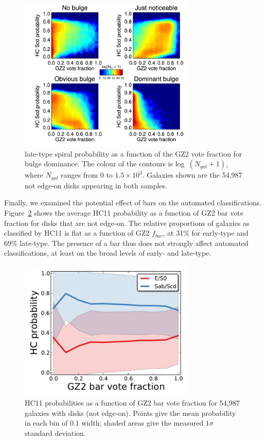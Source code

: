 \documentclass[useAMS,usenatbib]{mn2e}
\begin{document}
\begin{figure}
\includegraphics[angle=0,width=3.3in]{figures/hc_gz2_bulge_contour.pdf}
\caption{\citet{hue11} late-type spiral probability as a function of the GZ2 vote fraction for bulge dominance. The colour of the contours is log~$(N_{gal} + 1)$, where $N_{gal}$ ranges from 0 to $1.5\times10^3$. Galaxies shown are the 54,987 not edge-on disks appearing in both samples.
\label{fig-hc_gz2_bulge_contour}}
\end{figure}

Finally, we examined the potential effect of bars on the automated classifications. Figure~\ref{fig-hc_gz2_bar} shows the average HC11 probability as a function of GZ2 bar vote fraction for disks that are not edge-on. The relative proportions of galaxies as classified by HC11 is flat as a function of GZ2 $f_{bar}$, at 31\% for early-type and 69\% late-type. The presence of a bar thus does not strongly affect automated classifications, at least on the broad levels of early- and late-type. 

\begin{figure}
\includegraphics[angle=0,width=3.3in]{figures/hc_gz2_bar.pdf}
\caption{HC11 probabilities as a function of GZ2 bar vote fraction for 54,987 galaxies with disks (not edge-on). Points give the mean probability in each bin of 0.1 width; shaded areas give the measured $1\sigma$ standard deviation. 
\label{fig-hc_gz2_bar}}
\end{figure}
\end{document}
